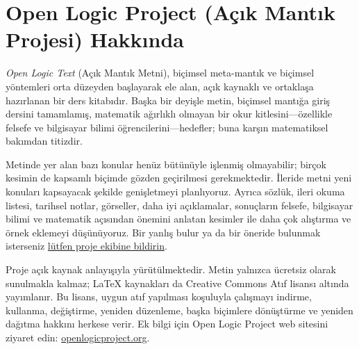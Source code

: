 \chapter*{Open Logic Project (Açık Mantık Projesi) Hakkında}

\textit{Open Logic Text} (Açık Mantık Metni), biçimsel meta-mantık ve biçimsel yöntemleri orta
düzeyden başlayarak ele alan, açık kaynaklı ve ortaklaşa hazırlanan bir ders
kitabıdır. Başka bir deyişle metin, biçimsel mantığa giriş dersini tamamlamış,
matematik ağırlıklı olmayan bir okur kitlesini---özellikle felsefe ve
bilgisayar bilimi öğrencilerini---hedefler; buna karşın matematiksel bakımdan
titizdir.

Metinde yer alan bazı konular henüz bütünüyle işlenmiş olmayabilir; birçok
kesimin de kapsamlı biçimde gözden geçirilmesi gerekmektedir. İleride metni
yeni konuları kapsayacak şekilde genişletmeyi planlıyoruz. Ayrıca sözlük, ileri
okuma listesi, tarihsel notlar, görseller, daha iyi açıklamalar, sonuçların
felsefe, bilgisayar bilimi ve matematik açısından önemini anlatan kesimler ile
daha çok alıştırma ve örnek eklemeyi düşünüyoruz. Bir yanlış bulur ya da bir
öneride bulunmak isterseniz
\href{https://github.com/OpenLogicProject/OpenLogic/wiki/Contributing}{lütfen
proje ekibine bildirin}.

Proje açık kaynak anlayışıyla yürütülmektedir. Metin yalnızca ücretsiz olarak
sunulmakla kalmaz; LaTeX kaynakları da Creative Commons Atıf lisansı altında
yayımlanır. Bu lisans, uygun atıf yapılması koşuluyla çalışmayı indirme,
kullanma, değiştirme, yeniden düzenleme, başka biçimlere dönüştürme ve yeniden
dağıtma hakkını herkese verir. Ek bilgi için Open Logic Project web sitesini
ziyaret edin: \href{http://openlogicproject.org/}{openlogicproject.org}.
